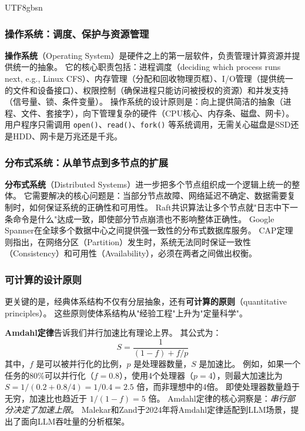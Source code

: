 \documentclass[11pt,a4paper]{article}
\begin{document}
\begin{CJK*}{UTF8}{gbsn}
\subsubsection{操作系统：调度、保护与资源管理}

\textbf{操作系统}（Operating System）是硬件之上的第一层软件，负责管理计算资源并提供统一的抽象。
它的核心职责包括：进程调度（deciding which process runs next, e.g., Linux CFS\cite{linux_cfs_2026}）、内存管理（分配和回收物理页框）、I/O管理（提供统一的文件和设备接口）、权限控制（确保进程只能访问被授权的资源）和并发支持（信号量、锁、条件变量）\cite{ostep_2023,xv6_2022}。
操作系统的设计原则是：向上提供简洁的抽象（进程、文件、套接字），向下管理复杂的硬件（CPU核心、内存条、磁盘、网卡）。
用户程序只需调用 \texttt{open()}、\texttt{read()}、\texttt{fork()} 等系统调用，无需关心磁盘是SSD还是HDD、网卡是万兆还是千兆。

\subsubsection{分布式系统：从单节点到多节点的扩展}

\textbf{分布式系统}（Distributed Systems）进一步把多个节点组织成一个逻辑上统一的整体。
它需要解决的核心问题是：当部分节点故障、网络延迟不确定、数据需要复制时，如何保证系统的正确性和可用性\cite{cap2002}。
Raft共识算法\cite{raft2014}让多个节点就"日志中下一条命令是什么"达成一致，即使部分节点崩溃也不影响整体正确性。
Google Spanner\cite{spanner2012}在全球多个数据中心之间提供强一致性的分布式数据库服务。
CAP定理\cite{cap2002}则指出，在网络分区（Partition）发生时，系统无法同时保证一致性（Consistency）和可用性（Availability），必须在两者之间做出权衡。

\subsubsection{可计算的设计原则}

更关键的是，经典体系结构不仅有分层抽象，还有\textbf{可计算的原则}（quantitative principles）。
这些原则使体系结构从"经验工程"上升为"定量科学"。

\textbf{Amdahl定律}告诉我们并行加速比有理论上界。
其公式为：
\begin{equation}
\label{eq:amdahl}
S = \frac{1}{(1-f) + f/p}
\end{equation}
其中，$f$ 是可以被并行化的比例，$p$ 是处理器数量，$S$ 是加速比。
例如，如果一个任务的80\%可以并行化（$f=0.8$），使用4个处理器（$p=4$），则最大加速比为 $S = 1/(0.2 + 0.8/4) = 1/0.4 = 2.5$ 倍，而非理想中的4倍。
即使处理器数量趋于无穷，加速比也趋近于 $1/(1-f) = 5$ 倍。
Amdahl定律的核心洞察是：\emph{串行部分决定了加速上限}。
Malekar和Zand于2024年将Amdahl定律适配到LLM场景，提出了面向LLM吞吐量的分析框架\cite{malekar2024amdahlllm}。


\end{CJK*}
\end{document}
